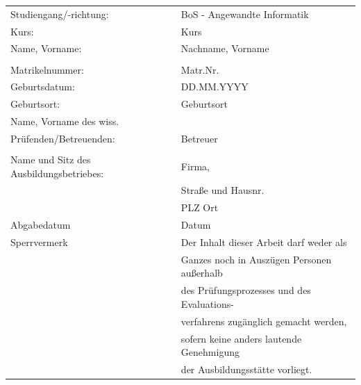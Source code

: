 \begin{titlepage}
\vspace{2pt}
\begin{singlespace}
\begin{tabular}{ll}
         \small Studiengang/-richtung:       	& BoS - Angewandte Informatik   \\
         \small Kurs:                 			& Kurs   						\\
         \small Name, Vorname:                 & Nachname, Vorname          	 	\\
        \\
         \small Matrikelnummer:        		& Matr.Nr.        				\\
         \small Geburtsdatum:      			& DD.MM.YYYY        			\\
         \small Geburtsort:					& Geburtsort						\\
         \small Name, Vorname des wiss.\\ Prüfenden/Betreuenden: 
         \small & Betreuer \\
        \\
         \small Name und Sitz des Ausbildungsbetriebes: & Firma,\\
         \small & Straße und Hausnr.		\\
         \small & PLZ Ort	\\
         \small Abgabedatum		& Datum		\\
         \small Sperrvermerk		& Der Inhalt dieser Arbeit darf weder als\\
         \small & Ganzes noch in Auszügen Personen außerhalb\\
         \small & des Prüfungsprozesses und des Evaluations-\\
         \small & verfahrens zugänglich gemacht werden,\\
         \small & sofern keine anders lautende Genehmigung\\
         \small & der Ausbildungsstätte vorliegt.  \\
    \end{tabular}
    \end{singlespace}


\vspace{49.7pt}

\end{titlepage}
